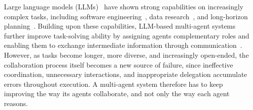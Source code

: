 \documentclass{article} %
\begin{document}



Large language models (LLMs)~\citep{chatgpt} have shown strong capabilities on increasingly complex tasks, including software engineering~\citep{yang2024sweagent,wang2024openhands,zhang2024autocoderover}, data research~\citep{liu2026ddrbench,li2024deveval}, and long-horizon planning~\citep{zhang2026deepplanning,xu2024theagentcompany}. Building upon these capabilities, LLM-based multi-agent systems further improve task-solving ability by assigning agents complementary roles and enabling them to exchange intermediate information through communication~\citep{wang2024survey,xi2023rise,hong2024metagptmetaprogrammingmultiagent,qian2024chatdevcommunicativeagentssoftware,wu2023autogenenablingnextgenllm}. However, as tasks become longer, more diverse, and increasingly open-ended, the collaboration process itself becomes a new source of failure, since ineffective coordination, unnecessary interactions, and inappropriate delegation accumulate errors throughout execution. A multi-agent system therefore has to keep improving the way its agents collaborate, and not only the way each agent reasons.
\end{document}
